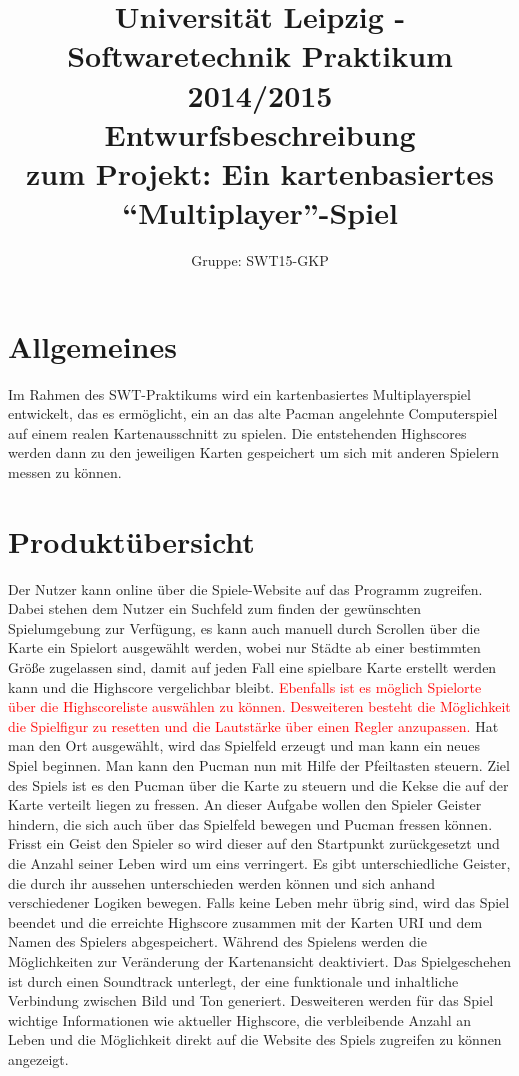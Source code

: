 \documentclass[11pt,a4paper]{article}
\author{Gruppe: SWT15-GKP}
\title{Universität Leipzig - Softwaretechnik Praktikum 2014/2015 \\  Entwurfsbeschreibung \\ zum Projekt: Ein kartenbasiertes “Multiplayer”-Spiel}
\begin{document}
\maketitle


\tableofcontents

\clearpage

\section{Allgemeines}
Im Rahmen des SWT-Praktikums wird ein kartenbasiertes Multiplayerspiel entwickelt, das es ermöglicht, ein an das alte Pacman angelehnte Computerspiel auf einem realen Kartenausschnitt zu spielen. Die entstehenden Highscores werden dann zu den jeweiligen Karten gespeichert um sich mit anderen Spielern messen zu können.


\section{Produktübersicht}
Der Nutzer kann online über die Spiele-Website auf das Programm zugreifen.
Dabei stehen dem Nutzer ein Suchfeld zum finden der gewünschten Spielumgebung zur Verfügung, es kann auch manuell durch Scrollen über die Karte ein Spielort ausgewählt werden, wobei nur Städte ab einer bestimmten Größe zugelassen sind, damit auf jeden Fall eine spielbare Karte erstellt werden kann und die Highscore vergelichbar bleibt. 
\textcolor{red}{Ebenfalls ist es möglich Spielorte über die Highscoreliste auswählen zu können. 
Desweiteren besteht die Möglichkeit die Spielfigur zu resetten und die Lautstärke über einen Regler anzupassen.}
Hat man den Ort ausgewählt, wird das Spielfeld erzeugt und man kann ein neues Spiel beginnen. 
Man kann den Pucman nun mit Hilfe der Pfeiltasten steuern.
Ziel des Spiels ist es den Pucman über die Karte zu steuern und die Kekse die auf der Karte verteilt liegen zu fressen. An dieser Aufgabe wollen den Spieler Geister hindern, die sich auch über das Spielfeld bewegen und Pucman fressen können. Frisst ein Geist den Spieler so wird dieser auf den Startpunkt zurückgesetzt und die Anzahl seiner Leben wird um eins verringert.
Es gibt unterschiedliche Geister, die durch ihr aussehen unterschieden werden können und sich anhand verschiedener Logiken bewegen. 
Falls keine Leben mehr übrig sind, wird das Spiel beendet und die erreichte Highscore zusammen mit der Karten URI und dem Namen des Spielers abgespeichert.
Während des Spielens werden die Möglichkeiten zur Veränderung der Kartenansicht deaktiviert. 
Das Spielgeschehen ist durch einen Soundtrack unterlegt, der eine funktionale und inhaltliche Verbindung zwischen Bild und Ton generiert.
Desweiteren werden für das Spiel wichtige Informationen wie aktueller Highscore, die verbleibende Anzahl an Leben und die Möglichkeit direkt auf die Website des Spiels zugreifen zu können angezeigt.
\clearpage
\end{document}
